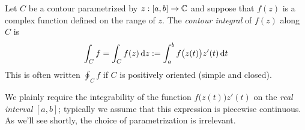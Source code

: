 \begin{defn}{}{}
Let $C$ be a contour parametrized by $z:[a,b]\to\mathbb{C}$ and suppose that $f(z)$ is a complex function defined on the range of $z$. The \emph{contour integral} of $f(z)$ along $C$ is
\[\int_Cf=\int_Cf(z)\,{\mathrm{d} z}:=\int_a^bf\bigl(z(t)\bigr) z'(t)\,{\mathrm{d} t}\]
This is often written $\oint_Cf$ if $C$ is positively oriented (simple and closed).%
\end{defn}

We plainly require the integrability of the function $f\bigl(z(t)\bigr)z'(t)$ on the \emph{real interval} $[a,b]$; typically we assume that this expression is piecewise continuous. As we'll see shortly, the choice of parametrization is irrelevant.
\goodbreak



